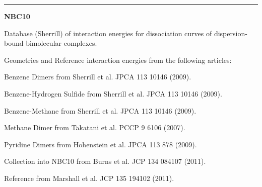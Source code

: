 \documentclass[letterpaper,10pt,english]{sphinxmanual}
\begin{document}
\bigskip\hrule{}\bigskip

\label{index:module-NBC10}
\textbf{NBC10}

\begin{DUlineblock}{0em}
\item[] Database (Sherrill) of interaction energies for dissociation curves of dispersion-bound bimolecular complexes.
\item[] Geometries and Reference interaction energies from the following articles:
\item[]
\begin{DUlineblock}{\DUlineblockindent}
\item[] Benzene Dimers from Sherrill et al. JPCA 113 10146 (2009).
\item[] Benzene-Hydrogen Sulfide from Sherrill et al. JPCA 113 10146 (2009).
\item[] Benzene-Methane from Sherrill et al. JPCA 113 10146 (2009).
\item[] Methane Dimer from Takatani et al. PCCP 9 6106 (2007).
\item[] Pyridine Dimers from Hohenstein et al. JPCA 113 878 (2009).
\item[] Collection into NBC10 from Burns et al. JCP 134 084107 (2011).
\item[] Reference from Marshall et al. JCP 135 194102 (2011).
\end{DUlineblock}
\end{DUlineblock}
\end{document}
